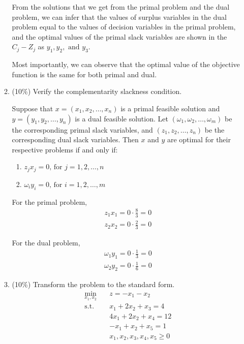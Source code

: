 \documentclass[a4paper,10pt]{article}
\begin{document}
\begin{enumerate}
\begin{enumerate}
{            From the solutions that we get from the primal problem and the dual problem, we can infer that the values of surplus variables in the dual problem equal to the values of decision variables in the primal problem, 
            and the optimal values of the primal slack variables are shown in the $C_j - Z_j$ as $y_1, y_2, \text{ and } y_3$. 
            
            Most importantly, we can observe that the optimal value of the objective function is the same for both primal and dual.
        }

        \item (10\%) Verify the complementarity slackness condition.
        {\color{blue}

            Suppose that $x = (x_1, x_2, \ldots, x_n)$ is a {\color{red}primal feasible} solution and $y = (y_1, y_2, \ldots, y_n)$ is a {\color{red}dual feasible} solution. 
            Let $(\omega_1, \omega_2, \ldots, \omega_m)$ be the corresponding primal slack variables, and $(z_1, z_2, \ldots, z_n)$ be the corresponding dual slack variables.
            Then {\color{red} $x$ and $y$ are optimal} for their respective problems if and only if:
            \begin{enumerate}
                \item $z_j x_j = 0 \text{, for } j = 1, 2, \ldots, n$
                \item $\omega_i y_i = 0 \text{, for } i = 1, 2, \ldots, m$
            \end{enumerate} 

            For the primal problem, 
            \begin{align}
                z_1 x_1 = 0 \cdot \frac{8}{3} = 0 \\
                z_2 x_2 = 0 \cdot \frac{2}{3} = 0
            \end{align}

            For the dual problem, 
            \begin{align}
                \omega_1 y_1 = 0 \cdot \frac{1}{3} = 0 \\
                \omega_2 y_2 = 0 \cdot \frac{1}{6} = 0
            \end{align}
        }

        \item (10\%) Transform the problem to the standard form.
        {\color{blue} 
            \begin{equation}
                \begin{aligned}
                    \min_{x_1,x_2} \quad & z = - x_1 - x_2 \\
                    \textrm{s.t.} \quad & x_1 + 2x_2 + x_3 = 4 \\
                        \quad & 4x_1 + 2x_2 + x_4 =  12   \\
                        \quad & -x_1 + x_2 + x_5 = 1  \\
                        \quad & x_1, x_2, x_3, x_4, x_5 \geq 0
                \end{aligned}
            \end{equation}
        }


\end{enumerate}
\end{enumerate}
\end{document}
